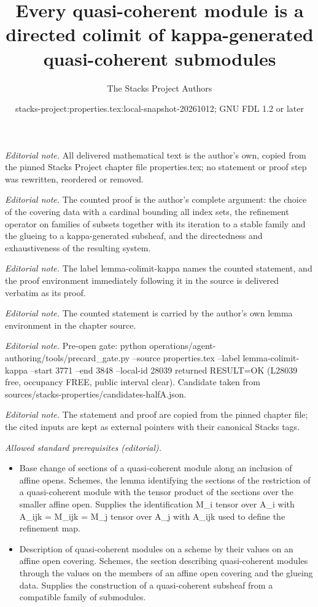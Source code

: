 \documentclass[10pt,a4paper]{amsart}
\title{Every quasi-coherent module is a directed colimit of kappa-generated quasi-coherent submodules}
\author{The Stacks Project Authors}
\date{stacks-project:properties.tex:local-snapshot-20261012; GNU FDL 1.2 or later}
\theoremstyle{plain}
\theoremstyle{definition}
\theoremstyle{remark}
\numberwithin{equation}{subsection}
\begin{document}
\maketitle
\noindent\textit{Editorial note.} All delivered mathematical text is the author's own, copied from the pinned Stacks Project chapter file properties.tex; no statement or proof step was rewritten, reordered or removed.\par\medskip
\noindent\textit{Editorial note.} The counted proof is the author's complete argument: the choice of the covering data with a cardinal bounding all index sets, the refinement operator on families of subsets together with its iteration to a stable family and the glueing to a kappa-generated subsheaf, and the directedness and exhaustiveness of the resulting system.\par\medskip
\noindent\textit{Editorial note.} The label lemma-colimit-kappa names the counted statement, and the proof environment immediately following it in the source is delivered verbatim as its proof.\par\medskip
\noindent\textit{Editorial note.} The counted statement is carried by the author's own lemma environment in the chapter source.\par\medskip
\noindent\textit{Editorial note.} Pre-open gate: python operations/agent-authoring/tools/precard\_gate.py --source properties.tex --label lemma-colimit-kappa --start 3771 --end 3848 --local-id 28039 returned RESULT=OK (L28039 free, occupancy FREE, public interval clear). Candidate taken from sources/stacks-properties/candidates-halfA.json.\par\medskip
\noindent\textit{Editorial note.} The statement and proof are copied from the pinned chapter file; the cited inputs are kept as external pointers with their canonical Stacks tags.\par\medskip
\noindent\textit{Allowed standard prerequisites (editorial).}\begin{itemize}
\item Base change of sections of a quasi-coherent module along an inclusion of affine opens. Schemes, the lemma identifying the sections of the restriction of a quasi-coherent module with the tensor product of the sections over the smaller affine open. Supplies the identification M\_i tensor over A\_i with A\_ijk = M\_ijk = M\_j tensor over A\_j with A\_ijk used to define the refinement map.
\item Description of quasi-coherent modules on a scheme by their values on an affine open covering. Schemes, the section describing quasi-coherent modules through the values on the members of an affine open covering and the glueing data. Supplies the construction of a quasi-coherent subsheaf from a compatible family of submodules.
\end{itemize}\medskip
\end{document}
